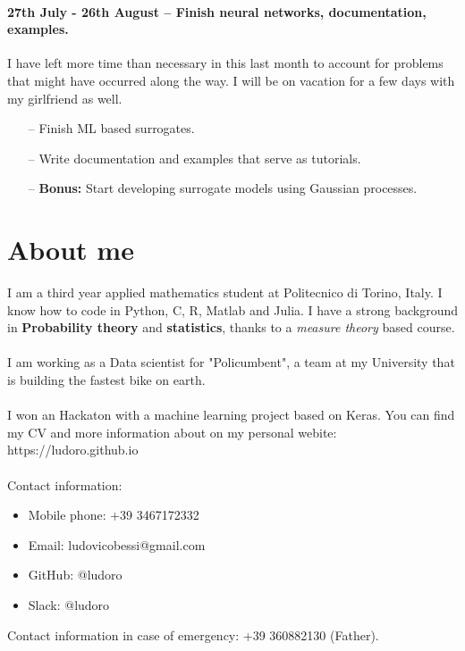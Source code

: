 \documentclass[11pt,a4paper,oneside,titlepage,openright]{book}
\begin{document}
\subsubsection*{27th July - 26th August -- Finish neural networks, documentation, examples. }
I have left more time than necessary in this last month to account for problems that might have occurred along the way. I will be on vacation for a few days with my girlfriend as well. \\
\begin{itemize}
\item[--] Finish ML based surrogates.
\item[--] Write documentation and examples that serve as tutorials.
\item[--] \textbf{Bonus:} Start developing surrogate models using Gaussian processes.

\end{itemize}



\begingroup
\let\clearpage\relax
\chapter*{About me}

I am a third year applied mathematics student at Politecnico di Torino, Italy. I know how to code in Python, C, R, Matlab and Julia. I have a strong background in \textbf{Probability theory} and \textbf{statistics}, thanks to a \textit{measure theory} based course.\\\\ 
I am working as a Data scientist for "Policumbent", a team at my University that is building the fastest bike on earth.\\\\
I won an Hackaton with a machine learning project based on Keras. You can find my CV and more information about on my personal webite:  https://ludoro.github.io  
\\\\
Contact information: 

\begin{itemize}
\item Mobile phone: +39 3467172332
\item Email: ludovicobessi@gmail.com
\item GitHub: @ludoro 
\item Slack: @ludoro

\end{itemize}
 
 Contact information in case of emergency: +39 360882130 (Father).
\endgroup
\end{document}
